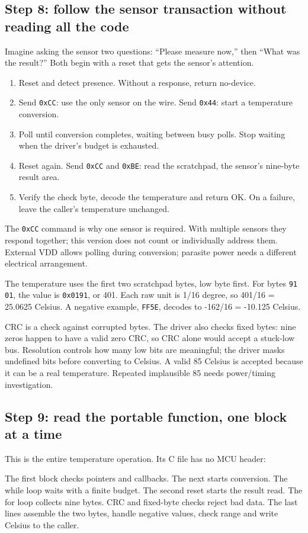 \subsection{Step 8: follow the sensor transaction without reading all the code}
Imagine asking the sensor two questions: ``Please measure now,'' then ``What was the result?'' Both begin with a reset that gets the sensor's attention.
\begin{enumerate}
\item Reset and detect presence. Without a response, return no-device.
\item Send \texttt{0xCC}: use the only sensor on the wire. Send \texttt{0x44}: start a temperature conversion.
\item Poll until conversion completes, waiting between busy polls. Stop waiting when the driver's budget is exhausted.
\item Reset again. Send \texttt{0xCC} and \texttt{0xBE}: read the scratchpad, the sensor's nine-byte result area.
\item Verify the check byte, decode the temperature and return OK. On a failure, leave the caller's temperature unchanged.
\end{enumerate}
The \texttt{0xCC} command is why one sensor is required. With multiple sensors they respond together; this version does not count or individually address them. External VDD allows polling during conversion; parasite power needs a different electrical arrangement.

The temperature uses the first two scratchpad bytes, low byte first. For bytes \texttt{91 01}, the value is \texttt{0x0191}, or 401. Each raw unit is 1/16 degree, so 401/16 = 25.0625 Celsius. A negative example, \texttt{FF5E}, decodes to -162/16 = -10.125 Celsius.

CRC is a check against corrupted bytes. The driver also checks fixed bytes: nine zeros happen to have a valid zero CRC, so CRC alone would accept a stuck-low bus. Resolution controls how many low bits are meaningful; the driver masks undefined bits before converting to Celsius. A valid 85 Celsius is accepted because it can be a real temperature. Repeated implausible 85 needs power/timing investigation.

\subsection{Step 9: read the portable function, one block at a time}
This is the entire temperature operation. Its C file has no MCU header:

The first block checks pointers and callbacks. The next starts conversion. The while loop waits with a finite budget. The second reset starts the result read. The for loop collects nine bytes. CRC and fixed-byte checks reject bad data. The last lines assemble the two bytes, handle negative values, check range and write Celsius to the caller.

